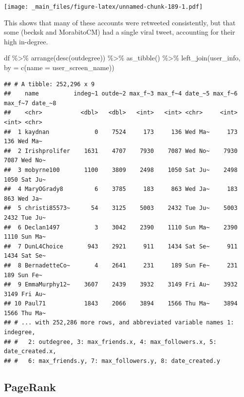 \documentclass[
]{book}
\newenvironment{Shaded}{\begin{snugshade}}{\end{snugshade}}
\newcommand{\AttributeTok}[1]{\textcolor[rgb]{0.77,0.63,0.00}{#1}}
\newcommand{\FunctionTok}[1]{\textcolor[rgb]{0.00,0.00,0.00}{#1}}
\newcommand{\NormalTok}[1]{#1}
\newcommand{\OtherTok}[1]{\textcolor[rgb]{0.56,0.35,0.01}{#1}}
\newcommand{\SpecialCharTok}[1]{\textcolor[rgb]{0.00,0.00,0.00}{#1}}
\newcommand{\StringTok}[1]{\textcolor[rgb]{0.31,0.60,0.02}{#1}}
\begin{document}
\texttt{[image: \_main\_files/figure-latex/unnamed-chunk-189-1.pdf]}

This shows that many of these accounts were retweeted consistently, but that some (becksk and MorabitoCM) had a single viral tweet, accounting for their high in-degree.

\begin{Shaded}
\begin{Highlighting}[]
\NormalTok{df }\SpecialCharTok{\%\textgreater{}\%} \FunctionTok{arrange}\NormalTok{(}\FunctionTok{desc}\NormalTok{(outdegree)) }\SpecialCharTok{\%\textgreater{}\%} \FunctionTok{as\_tibble}\NormalTok{() }\SpecialCharTok{\%\textgreater{}\%}
  \FunctionTok{left\_join}\NormalTok{(user\_info, }\AttributeTok{by =} \FunctionTok{c}\NormalTok{(}\StringTok{\textquotesingle{}name\textquotesingle{}} \OtherTok{=} \StringTok{\textquotesingle{}user\_screen\_name\textquotesingle{}}\NormalTok{))}
\end{Highlighting}
\end{Shaded}

\begin{verbatim}
## # A tibble: 252,296 x 9
##    name          indeg~1 outde~2 max_f~3 max_f~4 date_~5 max_f~6 max_f~7 date_~8
##    <chr>           <dbl>   <dbl>   <int>   <int> <chr>     <int>   <int> <chr>  
##  1 kaydnan             0    7524     173     136 Wed Ma~     173     136 Wed Ma~
##  2 Irishprolifer    1631    4707    7930    7087 Wed No~    7930    7087 Wed No~
##  3 mobyrne100       1100    3809    2498    1050 Sat Ju~    2498    1050 Sat Ju~
##  4 MaryOGrady8         6    3785     183     863 Wed Ja~     183     863 Wed Ja~
##  5 christi85573~      54    3125    5003    2432 Tue Ju~    5003    2432 Tue Ju~
##  6 Declan1497          3    3042    2390    1110 Sun Ma~    2390    1110 Sun Ma~
##  7 DunL4Choice       943    2921     911    1434 Sat Se~     911    1434 Sat Se~
##  8 BernadetteCo~       4    2641     231     189 Sun Fe~     231     189 Sun Fe~
##  9 EmmaMurphy12~    3607    2439    3932    3149 Fri Au~    3932    3149 Fri Au~
## 10 Paul71           1843    2066    3894    1566 Thu Ma~    3894    1566 Thu Ma~
## # ... with 252,286 more rows, and abbreviated variable names 1: indegree,
## #   2: outdegree, 3: max_friends.x, 4: max_followers.x, 5: date_created.x,
## #   6: max_friends.y, 7: max_followers.y, 8: date_created.y
\end{verbatim}

\hypertarget{pagerank}{%
\subsection{PageRank}\label{pagerank}}
\end{document}
